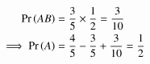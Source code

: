 \begin{align}
	\pr{AB}&=\frac{3}{5}\times \frac{1}{2}
=\frac{3}{10} 
\\
\implies
\pr{A}&=\frac{4}{5}-\frac{3}{5}+\frac{3}{10}
=\frac{1}{2}
	\label{eq:exemplar/12/13/3/64}
\end{align}
